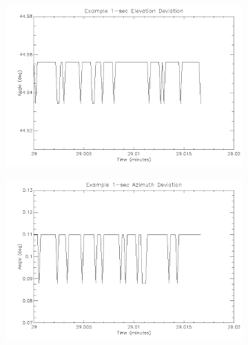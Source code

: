 {\newpage
\begin{figure}[htbp]
\captionsetup[subfigure]{justification=centering}
\captionsetup{justification=centering}
    \centering
	\begin{subfigure}{0.45\textwidth}
		\includegraphics[width=1\linewidth]{appendix/img/campaign_results/earlyalt1sec.png}
		\caption{}
		\label{fig:sub:earlyalt1}
	\end{subfigure}
	\begin{subfigure}{0.45\textwidth}
		\includegraphics[width=1\linewidth]{appendix/img/campaign_results/earlyaz1sec.png}
		\caption{}
		\label{fig:sub:earlyaz1}
	\end{subfigure}
	\begin{subfigure}{0.45\textwidth}

\end{subfigure}
\end{figure}}
